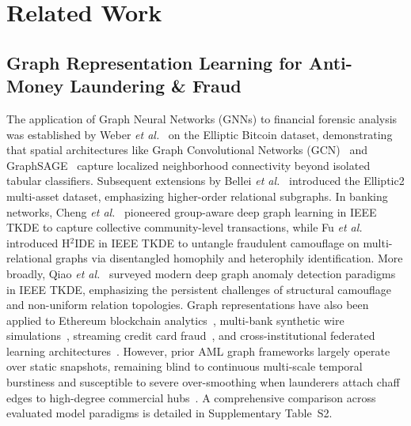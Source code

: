 \section{Related Work}

\subsection{Graph Representation Learning for Anti-Money Laundering \& Fraud}
The application of Graph Neural Networks (GNNs) to financial forensic analysis was established by Weber \textit{et al.}~\cite{weber2019anti} on the Elliptic Bitcoin dataset, demonstrating that spatial architectures like Graph Convolutional Networks (GCN)~\cite{kipf2017semi} and GraphSAGE~\cite{hamilton2017inductive} capture localized neighborhood connectivity beyond isolated tabular classifiers. Subsequent extensions by Bellei \textit{et al.}~\cite{bellei2024elliptic2} introduced the Elliptic2 multi-asset dataset, emphasizing higher-order relational subgraphs. In banking networks, Cheng \textit{et al.}~\cite{cheng2023anti} pioneered group-aware deep graph learning in IEEE TKDE to capture collective community-level transactions, while Fu \textit{et al.}~\cite{fu2025nowhere} introduced H$^2$IDE in IEEE TKDE to untangle fraudulent camouflage on multi-relational graphs via disentangled homophily and heterophily identification. More broadly, Qiao \textit{et al.}~\cite{qiao2025deep} surveyed modern deep graph anomaly detection paradigms in IEEE TKDE, emphasizing the persistent challenges of structural camouflage and non-uniform relation topologies. Graph representations have also been applied to Ethereum blockchain analytics~\cite{zheng2020xblock}, multi-bank synthetic wire simulations~\cite{lorenz2020samld, suzumura2019amlsim}, streaming credit card fraud~\cite{dalpozzolo2018credit}, and cross-institutional federated learning architectures~\cite{wang2023automated}. However, prior AML graph frameworks largely operate over static snapshots, remaining blind to continuous multi-scale temporal burstiness and susceptible to severe over-smoothing when launderers attach chaff edges to high-degree commercial hubs~\cite{dou2020enhancing}. A comprehensive comparison across evaluated model paradigms is detailed in Supplementary Table~S2.

